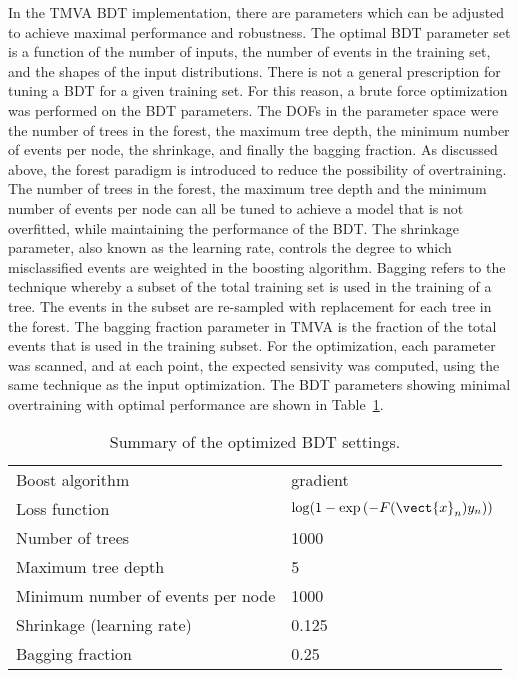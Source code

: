 In the TMVA BDT implementation, there are parameters which can be
adjusted to achieve maximal performance and robustness. The optimal BDT parameter set is a
function of the number of inputs, the number of events in the training
set, and the shapes of the input distributions. There is not a general
prescription for tuning a BDT for a given training set. For this reason, a brute force
optimization was performed on the BDT parameters. The DOFs in the
parameter space were the number of trees in the forest, the maximum
tree depth, the minimum number of events per node, the shrinkage, and
finally the bagging fraction. As discussed above, the forest paradigm
is introduced to reduce the possibility of overtraining. The number of
trees in the forest, the maximum tree depth and the minimum number of
events per node can all be tuned to achieve a model that is not
overfitted, while maintaining the performance of the BDT. The
shrinkage parameter, also known as the learning rate, controls the
degree to which misclassified events are weighted in the boosting
algorithm. Bagging refers to the technique whereby a subset of the
total training set is used in the training of a tree. The events in
the subset are re-sampled with replacement for each tree in the
forest. The bagging fraction parameter in TMVA is the fraction of the
total events that is used in the training subset. For the
optimization, each parameter was scanned, and at each point, the
expected sensivity was computed, using the same technique as the input
optimization. The BDT parameters showing minimal overtraining with
optimal performance are shown in Table~\ref{chap:bdt:tab:bdt_settings}.

\begin{table}
\begin{center}
\begin{tabular}{| l | l |}
    \hline
    Boost algorithm & gradient \\
    Loss function & \begin{math}\log
      (1-\exp{(-F(\vect{x}_n)y_n)})\end{math} \\
    Number of trees & 1000 \\
    Maximum tree depth & 5 \\
    Minimum number of events per node & 1000 \\
    Shrinkage (learning rate) & 0.125 \\
    Bagging fraction & 0.25 \\
    \hline
\end{tabular}
\caption[BDT setting summary.]{Summary of the optimized BDT settings.}
\label{chap:bdt:tab:bdt_settings}
\end{center}
\end{table}


